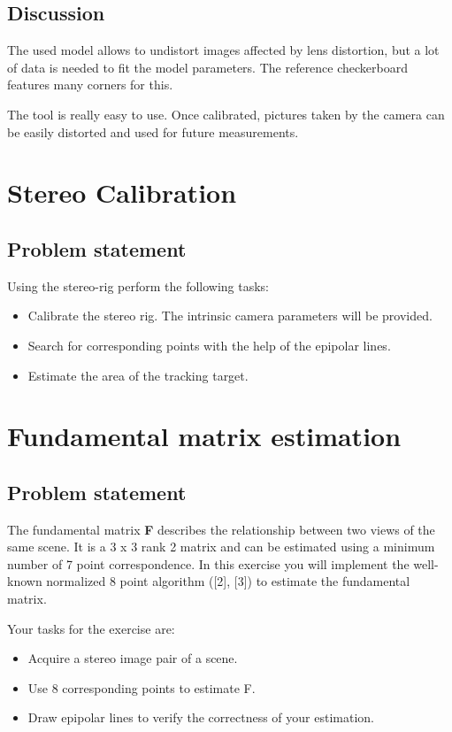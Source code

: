 \documentclass[
a4paper,     %
11pt         %
]{scrartcl}  %
\begin{document}
\subsection{Discussion}
The used model allows to undistort images affected by lens distortion, but a lot of data is needed to fit the model parameters. The reference checkerboard features many corners for this.

The tool is really easy to use. Once calibrated, pictures taken by the camera can be easily distorted and used for future measurements.

\FloatBarrier
\section{Stereo Calibration}

\subsection{Problem statement}

Using the stereo-rig perform the following tasks:

\begin{itemize}
 \item Calibrate the stereo rig. The intrinsic camera parameters will be provided.
 \item Search for corresponding points with the help of the epipolar lines.
 \item Estimate the area of the tracking target.
\end{itemize}

\newpage
\section{Fundamental matrix estimation}

\subsection{Problem statement}

The fundamental matrix \textbf{F} describes the relationship between two views of the same scene. It is a 3 x 3 rank
2 matrix and can be estimated using a minimum number of 7 point correspondence. In this exercise you will
implement the well-known normalized 8 point algorithm ([2], [3]) to estimate the fundamental matrix.

Your tasks for the exercise are:
\begin{itemize}
    \item Acquire a stereo image pair of a scene.
    \item Use 8 corresponding points to estimate F.
    \item Draw epipolar lines to verify the correctness of your estimation.
\end{itemize}
\end{document}
